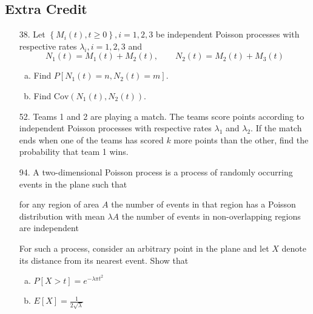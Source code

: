 \documentclass{article}
\newcommand{\cov}{\mathrm{Cov}}
\begin{document}
\subsection*{Extra Credit}

\begin{itemize}
	\item[38.] Let $\left\{ M_i(t), t\ge 0 \right\}, i=1, 2, 3$ be independent Poisson processes with respective rates $\lambda_i, i=1, 2, 3$ and
		\[N_1(t)=M_1(t)+M_2(t), \quad\quad N_2(t)=M_2(t)+M_3(t)\]
		\begin{enumerate}[(a)]
			\item Find $P[N_1(t)=n, N_2(t)=m].$

			\item Find $\cov(N_1(t), N_2(t)).$
				
		\end{enumerate}

	\item[52.] Teams 1 and 2 are playing a match. The teams score points according to independent Poisson processes with respective rates $\lambda_1$ and $\lambda_2.$ If the match ends when one of the teams has scored $k$ more points than the other, find the probability that team 1 wins.

	\item[94.] A two-dimensional Poisson process is a process of randomly occurring events in the plane such that
		\begin{enumerate}[(i)]
			\ii for any region of area $A$ the number of events in that region has a Poisson distribution with mean $\lambda A$
			\ii the number of events in non-overlapping regions are independent
		\end{enumerate}
		For such a process, consider an arbitrary point in the plane and let $X$ denote its distance from its nearest event. Show that
		\begin{enumerate}[(a)]
			\item $P[X>t]=e^{-\lambda \pi t^2}$

			\item $E[X]=\frac{1}{2\sqrt{\lambda}}$
				
		\end{enumerate}
		
\end{itemize}
\end{document}
